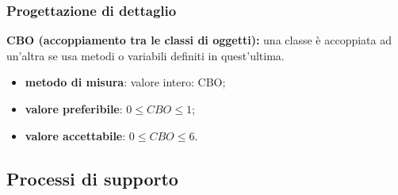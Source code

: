 \subsubsection{Progettazione di dettaglio}
\textbf{CBO (accoppiamento tra le classi di oggetti):} una classe è accoppiata ad un'altra se usa metodi o variabili definiti in quest'ultima.
\begin{itemize}
    \item \textbf{metodo di misura}: valore intero: CBO;
    \item \textbf{valore preferibile}: $0 \leq CBO \leq 1$;
    \item \textbf{valore accettabile}: $0 \leq CBO \leq 6$.
\end{itemize}
\subsection{Processi di supporto}
